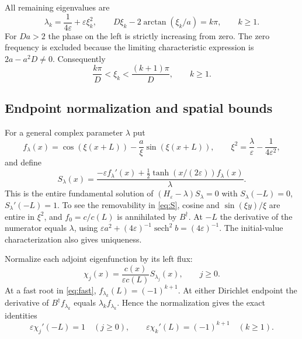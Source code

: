 \documentclass[11pt]{article}
\numberwithin{equation}{section}
\newcommand{\eps}{\varepsilon}
\newcommand{\sech}{\operatorname{sech}}
\begin{document}
All remaining eigenvalues are
\begin{equation}\label{eq:fast}
 \lambda_k=\frac1{4\eps}+\eps\xi_k^2,\qquad
 D\xi_k-2\arctan(\xi_k/a)=k\pi,\qquad k\ge1.
\end{equation}
For $Da>2$ the phase on the left is strictly increasing from zero.
The zero frequency is excluded because the limiting characteristic
expression is $2a-a^2D\ne0$. Consequently
\begin{equation}\label{eq:brackets}
 \frac{k\pi}{D}<\xi_k<\frac{(k+1)\pi}{D},\qquad k\ge1.
\end{equation}

\subsection{Endpoint normalization and spatial bounds}

For a general complex parameter $\lambda$ put
\[
 f_\lambda(x)=\cos(\xi(x+L))-\frac a\xi\sin(\xi(x+L)),\qquad
 \xi^2=\frac\lambda\eps-\frac1{4\eps^2},
\]
and define
\begin{equation}\label{eq:S}
 S_\lambda(x)=
 \frac{-\eps f_\lambda'(x)
              +\frac12\tanh(x/(2\eps))f_\lambda(x)}{\lambda}.
\end{equation}
This is the entire fundamental solution of
$(H_\eps-\lambda)S_\lambda=0$ with
$S_\lambda(-L)=0$, $S_\lambda'(-L)=1$.
To see the removability in \eqref{eq:S}, cosine and $\sin(\xi y)/\xi$
are entire in $\xi^2$, and $f_0=c/c(L)$ is annihilated by $B^\dagger$.
At $-L$ the derivative of the numerator equals $\lambda$, using
$\eps a^2+(4\eps)^{-1}\sech^2 b=(4\eps)^{-1}$.
The initial-value characterization also gives uniqueness.

Normalize each adjoint eigenfunction by its left flux:
\begin{equation}\label{eq:chi}
 \chi_j(x)=\frac{c(x)}{\eps c(L)}S_{\lambda_j}(x),\qquad j\ge0.
\end{equation}
At a fast root in \eqref{eq:fast},
$f_{\lambda_k}(L)=(-1)^{k+1}$.
At either Dirichlet endpoint the derivative of
$B^\dagger f_{\lambda_k}$ equals $\lambda_k f_{\lambda_k}$.
Hence the normalization gives the exact identities
\begin{equation}\label{eq:endpoint}
 \eps\chi_j'(-L)=1\quad(j\ge0),\qquad
 \eps\chi_k'(L)=(-1)^{k+1}\quad(k\ge1).
\end{equation}
\end{document}
